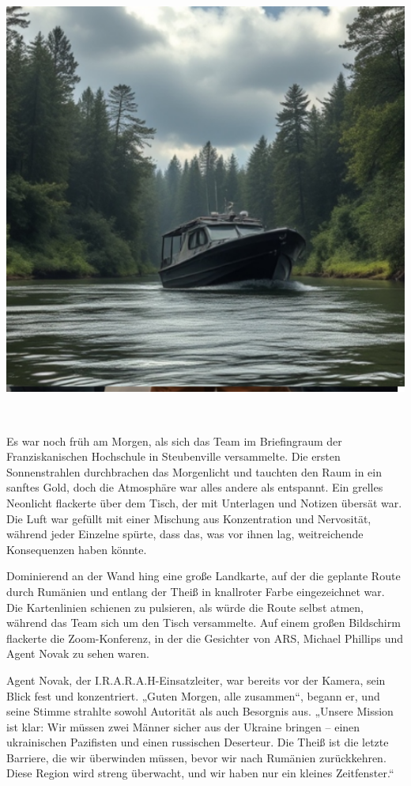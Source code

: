 \documentclass[
]{article}
\begin{document}
\includegraphics[width=6in,height=5.78125in]{media/image007.png}

Es war noch früh am Morgen, als sich das Team im Briefingraum der
Franziskanischen Hochschule in Steubenville versammelte. Die ersten
Sonnenstrahlen durchbrachen das Morgenlicht und tauchten den Raum in ein
sanftes Gold, doch die Atmosphäre war alles andere als entspannt. Ein
grelles Neonlicht flackerte über dem Tisch, der mit Unterlagen und
Notizen übersät war. Die Luft war gefüllt mit einer Mischung aus
Konzentration und Nervosität, während jeder Einzelne spürte, dass das,
was vor ihnen lag, weitreichende Konsequenzen haben könnte.

Dominierend an der Wand hing eine große Landkarte, auf der die geplante
Route durch Rumänien und entlang der Theiß in knallroter Farbe
eingezeichnet war. Die Kartenlinien schienen zu pulsieren, als würde die
Route selbst atmen, während das Team sich um den Tisch versammelte. Auf
einem großen Bildschirm flackerte die Zoom-Konferenz, in der die
Gesichter von ARS, Michael Phillips und Agent Novak zu sehen waren.

Agent Novak, der I.R.A.R.A.H-Einsatzleiter, war bereits vor der Kamera,
sein Blick fest und konzentriert. „Guten Morgen, alle zusammen``, begann
er, und seine Stimme strahlte sowohl Autorität als auch Besorgnis aus.
„Unsere Mission ist klar: Wir müssen zwei Männer sicher aus der Ukraine
bringen -- einen ukrainischen Pazifisten und einen russischen Deserteur.
Die Theiß ist die letzte Barriere, die wir überwinden müssen, bevor wir
nach Rumänien zurückkehren. Diese Region wird streng überwacht, und wir
haben nur ein kleines Zeitfenster.``
\end{document}
